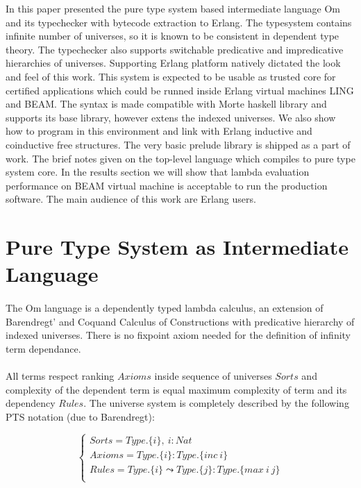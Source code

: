 \documentclass[11pt,oneside]{article}
\begin{document}
In this paper presented the pure type system based intermediate language Om and
its typechecker with bytecode extraction to Erlang. The typesystem contains infinite
number of universes, so it is known to be consistent in dependent type theory.
The typechecker also supports switchable predicative and impredicative hierarchies
of universes. Supporting Erlang platform natively dictated the look and feel of this work.
This system is expected to be usable as trusted core for certified
applications which could be runned inside Erlang virtual machines LING and BEAM.
The syntax is made compatible with Morte haskell library and supports its base
library, however extens the indexed universes.
We also show how to program in this environment and link with Erlang
inductive and coinductive free structures. The very basic prelude library is shipped
as a part of work. The brief notes given on the top-level
language which compiles to pure type system core. In the results section we will
show that lambda evaluation performance on BEAM virtual machine is acceptable to run the
production software. The main audience of this work are Erlang users.

\section{Pure Type System as Intermediate Language}

\paragraph{}
The Om language is a dependently typed lambda calculus, an extension of Barendregt'
and Coquand Calculus of Constructions with predicative hierarchy of indexed universes.
There is no fixpoint axiom needed for the definition of infinity term dependance.

\paragraph{}
All terms respect ranking $Axioms$ inside sequence of universes $Sorts$ and complexity of the
dependent term is equal maximum complexity of term and its dependency $Rules$. The universe
system is completely described by the following PTS notation (due to Barendregt):

$$
\begin{cases}
Sorts = Type.\{i\},\ i : Nat\\
Axioms = Type.\{i\} : Type.\{inc\ i\}\\
Rules = Type.\{i\} \leadsto Type.\{j\} : Type.\{max\ i\ j\}\\
\end{cases}
$$
\end{document}
